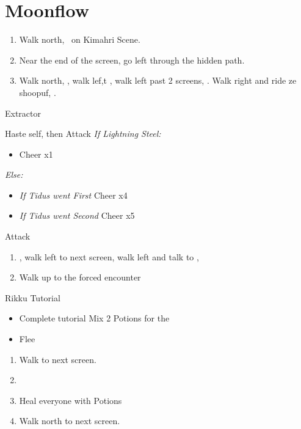 \chapter{Moonflow}

\begin{enumerate}
	\item Walk north, \sd\ on Kimahri Scene.
	\item Near the end of the screen, go left through the hidden path. 
	\item Walk north, \sd, walk lef,t \sd, walk left past 2 screens, \sd. Walk right and ride ze shoopuf, \sd.
\end{enumerate}
\begin{battle}[4000]{Extractor}
\begin{itemize}
	\tidusf Haste self, then \wakka
	\wakkaf Attack
	\textit{If Lightning Steel:}
	\begin{itemize}
		\item Cheer x1
	\end{itemize}
	\textit{Else:}
	\begin{itemize}
		\item \textit{If Tidus went First} Cheer x4 
		\item \textit{If Tidus went Second} Cheer x5
	\end{itemize}
	\tidusf Attack
\end{itemize}
\end{battle}
\begin{enumerate}[resume]
	\item \sd, walk left to next screen, walk left and talk to \rikku, \sd
	\item Walk up to the forced encounter
\end{enumerate}
\begin{battle}{Rikku Tutorial}
\begin{itemize}
	\item Complete tutorial
	\rikkuf Mix 2 Potions for the \od
	\item Flee
\end{itemize}
\end{battle}
\begin{enumerate}[resume]
	\item Walk to next screen.
	\item \formation{\tidus}{\yuna}{\auron}
	\item Heal everyone with Potions
	\item Walk north to next screen.
\end{enumerate}
